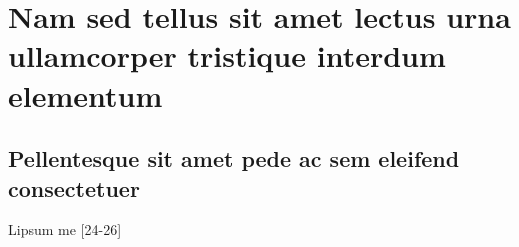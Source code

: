 
\cleardoublepage
{}




\chapter[Nam sed tellus sit amet lectus]{Nam sed tellus sit amet lectus urna ullamcorper tristique interdum
elementum}

\begin{flushright}
\showfont
\end{flushright}

\newpage



\section[Some encoding tests]{\showfont}
\subsection{\showfont}
\subsubsection{\showfont}
\subsubsubsection{\showfont}


\section{Pellentesque sit amet pede ac sem eleifend consectetuer}

Lipsum me [24-26]
